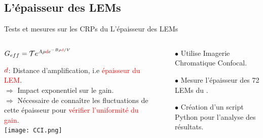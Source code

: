     \subsection[Épaisseur]{L'épaisseur des LEMs}
     \begin{frame}{Tests et mesures sur les CRPs du \SSS{}}{L'épaisseur des LEMs}
    	\begin{scriptsize}
    		\begin{columns}
    			\begin{column}{0.5\textwidth}
    				\begin{center}
    					$G _{eff}= \mathcal{T}e^{A\rho \textcolor{red}{d} e^{-B\rho \textcolor{red}{d}/V}}$\\
    				\end{center}
    				$\textcolor{red}{d}$: Distance d'amplification, i.e \textcolor{red}{épaisseur du LEM}.\\
    				$\Rightarrow$ Impact exponentiel sur le gain.\\
    				$\Rightarrow$ Nécessaire de connaître les fluctuations de cette épaisseur pour \textcolor{red}{vérifier l'uniformité du gain}.\\
    				\vfill
    				\centering \texttt{[image: CCI.png]}\\\vfill
    			\end{column}
    			\hfill
    			\begin{column}{0.5\textwidth}
    				\begin{itemize}
    					\item[$\bullet$] Utilise Imagerie Chromatique Confocal.
    					\item[$\bullet$] Mesure l'épaisseur des 72 LEMs du \SSS{}.
    					\item[$\bullet$] Création d'un script Python pour l'analyse des résultats.
    				\end{itemize}

\end{column}
\end{columns}
\end{scriptsize}
\end{frame}
